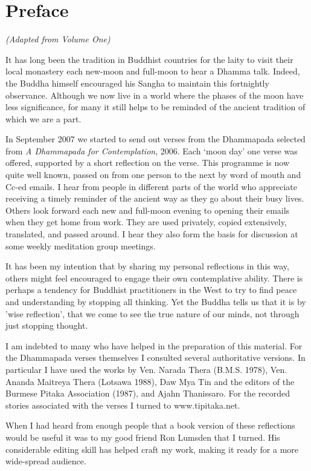 \chapter{Preface}

{\centering
\emph{(Adapted from Volume One)}
\par}

\bigskip

\noindent
It has long been the tradition in Buddhist countries for the laity to visit
their local monastery each new-moon and full-moon to hear a Dhamma talk. Indeed,
the Buddha himself encouraged his Sangha to maintain this fortnightly
observance. Although we now live in a world where the phases of the moon have
less significance, for many it still helps to be reminded of the ancient
tradition of which we are a part.

In September 2007 we started to send out verses from the Dhammapada selected
from \emph{A Dhammapada for Contemplation}, 2006. Each ‘moon day’ one verse was
offered, supported by a short reflection on the verse. This programme is now
quite well known, passed on from one person to the next by word of mouth and
Cc-ed emails. I hear from people in different parts of the world who appreciate
receiving a timely reminder of the ancient way as they go about their busy
lives. Others look forward each new and full-moon evening to opening their
emails when they get home from work. They are used privately, copied
extensively, translated, and passed around. I hear they also form the basis for
discussion at some weekly meditation group meetings.

It has been my intention that by sharing my personal reflections in this way,
others might feel encouraged to engage their own contemplative ability. There is
perhaps a tendency for Buddhist practitioners in the West to try to find peace
and understanding by stopping all thinking. Yet the Buddha tells us that it is
by 'wise reflection', that we come to see the true nature of our minds, not
through just stopping thought.

I am indebted to many who have helped in the preparation of this material. For
the Dhammapada verses themselves I consulted several authoritative versions. In
particular I have used the works by Ven. Narada Thera (B.M.S. 1978), Ven. Ananda
Maitreya Thera (Lotsawa 1988), Daw Mya Tin and the editors of the Burmese Pitaka
Association (1987), and Ajahn Thanissaro. For the recorded stories associated
with the verses I turned to www.tipitaka.net.

When I had heard from enough people that a book version of these reflections
would be useful it was to my good friend Ron Lumsden that I turned. His
considerable editing skill has helped craft my work, making it ready for a more
wide-spread audience.

